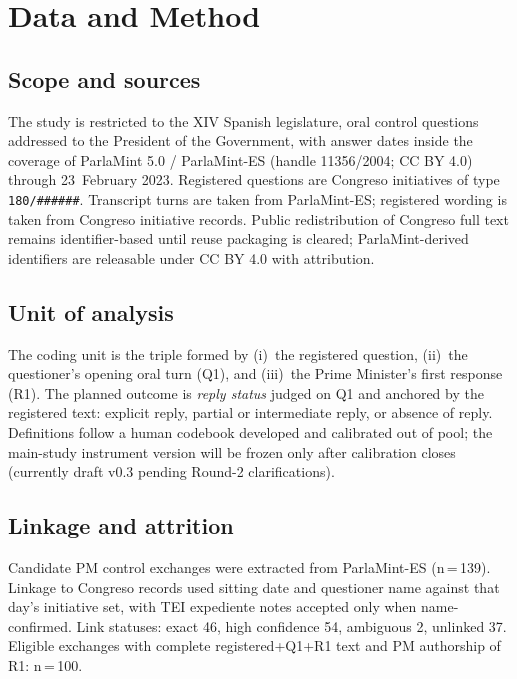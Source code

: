 \section{Data and Method}
\label{sec:data-method}

\subsection{Scope and sources}

The study is restricted to the XIV Spanish legislature, oral control questions
addressed to the President of the Government, with answer dates inside the
coverage of ParlaMint 5.0 / ParlaMint-ES (handle 11356/2004; CC BY 4.0) through
23~February 2023. Registered questions are Congreso initiatives of type
\texttt{180/######}. Transcript turns are taken from ParlaMint-ES; registered
wording is taken from Congreso initiative records. Public redistribution of
Congreso full text remains identifier-based until reuse packaging is cleared;
ParlaMint-derived identifiers are releasable under CC BY 4.0 with attribution.

\subsection{Unit of analysis}

The coding unit is the triple formed by (i)~the registered question,
(ii)~the questioner's opening oral turn (Q1), and (iii)~the Prime Minister's
first response (R1). The planned outcome is \emph{reply status} judged on Q1
and anchored by the registered text: explicit reply, partial or intermediate
reply, or absence of reply. Definitions follow a human codebook developed and
calibrated out of pool; the main-study instrument version will be frozen only
after calibration closes (currently draft v0.3 pending Round-2 clarifications).

\subsection{Linkage and attrition}

Candidate PM control exchanges were extracted from ParlaMint-ES (n\,=\,139).
Linkage to Congreso records used sitting date and questioner name against that
day's initiative set, with TEI expediente notes accepted only when
name-confirmed. Link statuses: exact 46, high confidence 54, ambiguous 2,
unlinked 37. Eligible exchanges with complete registered+Q1+R1 text and PM
authorship of R1: n\,=\,100.

